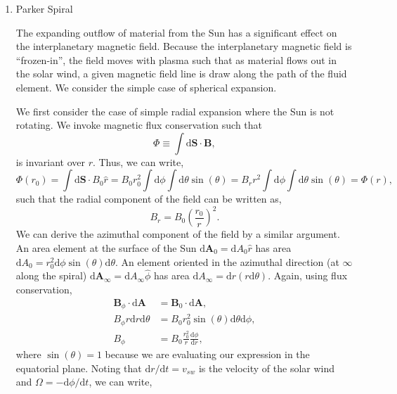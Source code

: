 \begin{enumerate}
\begin{enumerate}
				\item{Parker Spiral}
				\par The expanding outflow of material from the Sun has a significant effect on the interplanetary magnetic field. Because the interplanetary magnetic field is ``frozen-in'', the field moves with plasma such that as material flows out in the solar wind, a given magnetic field line is draw along the path of the fluid element. We consider the simple case of spherical expansion.
				\par We first consider the case of simple radial expansion where the Sun is not rotating. We invoke magnetic flux conservation such that 
				\begin{equation}
					\Phi\equiv\int\mathrm{d}\mathbf{S}\cdot\mathbf{B},
				\end{equation}
				is invariant over $r$. Thus, we can write,
				\begin{equation}
					\Phi(r_0)=\int\mathrm{d}\mathbf{S}\cdot B_0\hat{r} = B_0r_0^2\int\mathrm{d}\phi\int\mathrm{d}\theta\sin{(\theta)} = B_rr^2\int\mathrm{d}\phi\int\mathrm{d}\theta\sin{(\theta)} = \Phi(r),
				\end{equation}
				such that the radial component of the field can be written as,
				\begin{equation}
					B_r = B_0\left(\frac{r_0}{r}\right)^2.
				\end{equation}
				We can derive the azimuthal component of the field by a similar argument. An area element at the surface of the Sun $\mathrm{d}\mathbf{A}_0=\mathrm{d}A_0\hat{r}$ has area $\mathrm{d}A_0=r_0^2\mathrm{d}\phi\sin{(\theta)}\mathrm{d}\theta$. An element oriented in the azimuthal direction (at $\infty$ along the spiral) $\mathrm{d}\mathbf{A}_{\infty}=\mathrm{d}A_{\infty}\hat{\phi}$ has area $\mathrm{d}A_{\infty} = \mathrm{d}r(r\mathrm{d}\theta)$. Again, using flux conservation,
				\begin{align}
					\mathbf{B}_{\phi}\cdot\mathrm{d}\mathbf{A} &= \mathbf{B}_0\cdot\mathrm{d}\mathbf{A}, \\
					B_{\phi}r\mathrm{d}r\mathrm{d}\theta &= B_0r_0^2\sin{(\theta)}\mathrm{d}\theta\mathrm{d}\phi, \\
					B_{\phi} &= B_0\frac{r_0^2}{r}\frac{\mathrm{d}\phi}{\mathrm{d}r},
				\end{align}
				where $\sin{(\theta)}=1$ because we are evaluating our expression in the equatorial plane. Noting that $\mathrm{d}r/\mathrm{d}t=v_{sw}$ is the velocity of the solar wind and $\Omega=-\mathrm{d}\phi/\mathrm{d}t$, we can write,

\end{enumerate}
\end{enumerate}
